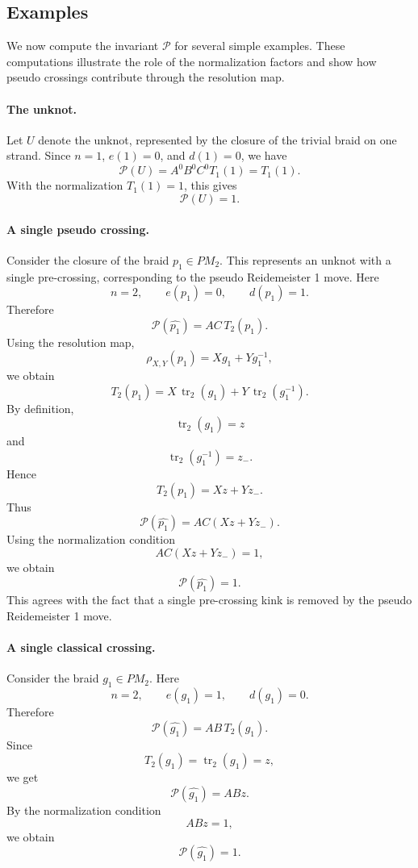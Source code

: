\documentclass[11pt]{article}
\numberwithin{equation}{section}
\theoremstyle{definition}
\begin{document}

\subsection{Examples}

We now compute the invariant \(\mathcal P\) for several simple examples. These computations illustrate the role of the normalization factors and show how pseudo crossings contribute through the resolution map.

\paragraph{The unknot.}
Let \(U\) denote the unknot, represented by the closure of the trivial braid on one strand. Since \(n=1\), \(e(1)=0\), and \(d(1)=0\), we have
\[
\mathcal P(U)
=
A^{0}B^{0}C^{0}T_1(1)
=
T_1(1).
\]
With the normalization \(T_1(1)=1\), this gives
\[
\mathcal P(U)=1.
\]

\paragraph{A single pseudo crossing.}
Consider the closure of the braid \(p_1\in PM_2\). This represents an unknot with a single pre-crossing, corresponding to the pseudo Reidemeister 1 move.
Here
\[
n=2,\qquad e(p_1)=0,\qquad d(p_1)=1.
\]
Therefore
\[
\mathcal P(\widehat{p_1})
=
A C\,T_2(p_1).
\]
Using the resolution map,
\[
\rho_{X,Y}(p_1)=Xg_1+Yg_1^{-1},
\]
we obtain
\[
T_2(p_1)
=
X\,\operatorname{tr}_2(g_1)
+
Y\,\operatorname{tr}_2(g_1^{-1}).
\]
By definition,
\[
\operatorname{tr}_2(g_1)=z
\]
and
\[
\operatorname{tr}_2(g_1^{-1})=z_-.
\]
Hence
\[
T_2(p_1)=Xz+Yz_-.
\]
Thus
\[
\mathcal P(\widehat{p_1})
=
AC(Xz+Yz_-).
\]
Using the normalization condition
\[
AC(Xz+Yz_-)=1,
\]
we obtain
\[
\mathcal P(\widehat{p_1})=1.
\]
This agrees with the fact that a single pre-crossing kink is removed by the pseudo Reidemeister 1 move.

\paragraph{A single classical crossing.}
Consider the braid \(g_1\in PM_2\). Here
\[
n=2,\qquad e(g_1)=1,\qquad d(g_1)=0.
\]
Therefore
\[
\mathcal P(\widehat{g_1})
=
AB\,T_2(g_1).
\]
Since
\[
T_2(g_1)=\operatorname{tr}_2(g_1)=z,
\]
we get
\[
\mathcal P(\widehat{g_1})
=
ABz.
\]
By the normalization condition
\[
ABz=1,
\]
we obtain
\[
\mathcal P(\widehat{g_1})=1.
\]
\end{document}
